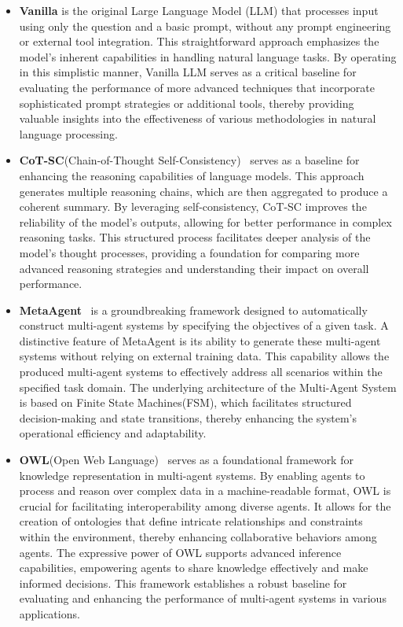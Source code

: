 \begin{itemize}[left=0pt]
    \item \textbf{Vanilla} is the original Large Language Model (LLM) that processes input using only the question and a basic prompt, without any prompt engineering or external tool integration. This straightforward approach emphasizes the model's inherent capabilities in handling natural language tasks. By operating in this simplistic manner, Vanilla LLM serves as a critical baseline for evaluating the performance of more advanced techniques that incorporate sophisticated prompt strategies or additional tools, thereby providing valuable insights into the effectiveness of various methodologies in natural language processing.
    \item \textbf{CoT-SC}(Chain-of-Thought Self-Consistency)~\citep{wang2023selfconsistencyimproveschainthought} serves as a baseline for enhancing the reasoning capabilities of language models. This approach generates multiple reasoning chains, which are then aggregated to produce a coherent summary. By leveraging self-consistency, CoT-SC improves the reliability of the model's outputs, allowing for better performance in complex reasoning tasks. This structured process facilitates deeper analysis of the model's thought processes, providing a foundation for comparing more advanced reasoning strategies and understanding their impact on overall performance.
    \item \textbf{MetaAgent}~\citep{zhang2025metaagentautomaticallyconstructingmultiagent} is a groundbreaking framework designed to automatically construct multi-agent systems by specifying the objectives of a given task. A distinctive feature of MetaAgent is its ability to generate these multi-agent systems without relying on external training data. This capability allows the produced multi-agent systems to effectively address all scenarios within the specified task domain. The underlying architecture of the Multi-Agent System is based on Finite State Machines(FSM), which facilitates structured decision-making and state transitions, thereby enhancing the system's operational efficiency and adaptability.
    \item \textbf{OWL}(Open Web Language)~\citep{hu2025owl} serves as a foundational framework for knowledge representation in multi-agent systems. By enabling agents to process and reason over complex data in a machine-readable format, OWL is crucial for facilitating interoperability among diverse agents. It allows for the creation of ontologies that define intricate relationships and constraints within the environment, thereby enhancing collaborative behaviors among agents. The expressive power of OWL supports advanced inference capabilities, empowering agents to share knowledge effectively and make informed decisions. This framework establishes a robust baseline for evaluating and enhancing the performance of multi-agent systems in various applications.

\end{itemize}
